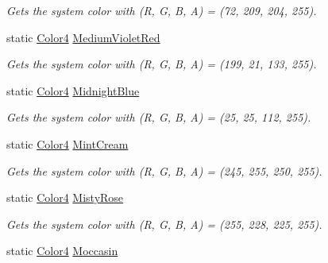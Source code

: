 \begin{DoxyCompactItemize}
\begin{DoxyCompactList}\small\item\em Gets the system color with (R, G, B, A) = (72, 209, 204, 255). \end{DoxyCompactList}\item 
static \hyperlink{struct_open_t_k_1_1_graphics_1_1_color4}{Color4} \hyperlink{struct_open_t_k_1_1_graphics_1_1_color4_a94934083e6150219fe0b91868ec0f837}{Medium\-Violet\-Red}
\begin{DoxyCompactList}\small\item\em Gets the system color with (R, G, B, A) = (199, 21, 133, 255). \end{DoxyCompactList}\item 
static \hyperlink{struct_open_t_k_1_1_graphics_1_1_color4}{Color4} \hyperlink{struct_open_t_k_1_1_graphics_1_1_color4_a131e8551c951f5304e2d4c30e7b8ddcc}{Midnight\-Blue}
\begin{DoxyCompactList}\small\item\em Gets the system color with (R, G, B, A) = (25, 25, 112, 255). \end{DoxyCompactList}\item 
static \hyperlink{struct_open_t_k_1_1_graphics_1_1_color4}{Color4} \hyperlink{struct_open_t_k_1_1_graphics_1_1_color4_a28f6f1f7352e1da02a45f83a77506569}{Mint\-Cream}
\begin{DoxyCompactList}\small\item\em Gets the system color with (R, G, B, A) = (245, 255, 250, 255). \end{DoxyCompactList}\item 
static \hyperlink{struct_open_t_k_1_1_graphics_1_1_color4}{Color4} \hyperlink{struct_open_t_k_1_1_graphics_1_1_color4_a0095673ded7895355a8d415f541d152a}{Misty\-Rose}
\begin{DoxyCompactList}\small\item\em Gets the system color with (R, G, B, A) = (255, 228, 225, 255). \end{DoxyCompactList}\item 
static \hyperlink{struct_open_t_k_1_1_graphics_1_1_color4}{Color4} \hyperlink{struct_open_t_k_1_1_graphics_1_1_color4_a93f2d6855f5eaa3c374f5e8ba58bd60d}{Moccasin}

\end{DoxyCompactItemize}
